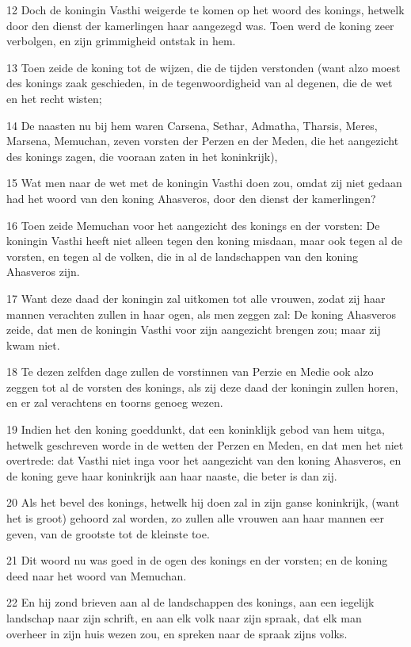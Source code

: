 \par 12 Doch de koningin Vasthi weigerde te komen op het woord des konings, hetwelk door den dienst der kamerlingen haar aangezegd was. Toen werd de koning zeer verbolgen, en zijn grimmigheid ontstak in hem.
\par 13 Toen zeide de koning tot de wijzen, die de tijden verstonden (want alzo moest des konings zaak geschieden, in de tegenwoordigheid van al degenen, die de wet en het recht wisten;
\par 14 De naasten nu bij hem waren Carsena, Sethar, Admatha, Tharsis, Meres, Marsena, Memuchan, zeven vorsten der Perzen en der Meden, die het aangezicht des konings zagen, die vooraan zaten in het koninkrijk),
\par 15 Wat men naar de wet met de koningin Vasthi doen zou, omdat zij niet gedaan had het woord van den koning Ahasveros, door den dienst der kamerlingen?
\par 16 Toen zeide Memuchan voor het aangezicht des konings en der vorsten: De koningin Vasthi heeft niet alleen tegen den koning misdaan, maar ook tegen al de vorsten, en tegen al de volken, die in al de landschappen van den koning Ahasveros zijn.
\par 17 Want deze daad der koningin zal uitkomen tot alle vrouwen, zodat zij haar mannen verachten zullen in haar ogen, als men zeggen zal: De koning Ahasveros zeide, dat men de koningin Vasthi voor zijn aangezicht brengen zou; maar zij kwam niet.
\par 18 Te dezen zelfden dage zullen de vorstinnen van Perzie en Medie ook alzo zeggen tot al de vorsten des konings, als zij deze daad der koningin zullen horen, en er zal verachtens en toorns genoeg wezen.
\par 19 Indien het den koning goeddunkt, dat een koninklijk gebod van hem uitga, hetwelk geschreven worde in de wetten der Perzen en Meden, en dat men het niet overtrede: dat Vasthi niet inga voor het aangezicht van den koning Ahasveros, en de koning geve haar koninkrijk aan haar naaste, die beter is dan zij.
\par 20 Als het bevel des konings, hetwelk hij doen zal in zijn ganse koninkrijk, (want het is groot) gehoord zal worden, zo zullen alle vrouwen aan haar mannen eer geven, van de grootste tot de kleinste toe.
\par 21 Dit woord nu was goed in de ogen des konings en der vorsten; en de koning deed naar het woord van Memuchan.
\par 22 En hij zond brieven aan al de landschappen des konings, aan een iegelijk landschap naar zijn schrift, en aan elk volk naar zijn spraak, dat elk man overheer in zijn huis wezen zou, en spreken naar de spraak zijns volks.

